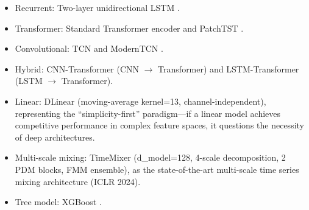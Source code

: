 \documentclass[a4paper]{cas-dc}
\begin{document}
\begin{itemize}[leftmargin=1.5em]
    \item Recurrent: Two-layer unidirectional LSTM \cite{hochreiter1997}.
    \item Transformer: Standard Transformer encoder \cite{vaswani2017} and PatchTST \cite{nie2023}.
    \item Convolutional: TCN \cite{bai2018} and ModernTCN \cite{luo2024}.
    \item Hybrid: CNN-Transformer (CNN $\rightarrow$ Transformer) and LSTM-Transformer (LSTM $\rightarrow$ Transformer).
    \item Linear: DLinear \cite{zeng2023} (moving-average kernel=13, channel-independent), representing the ``simplicity-first'' paradigm---if a linear model achieves competitive performance in complex feature spaces, it questions the necessity of deep architectures.
    \item Multi-scale mixing: TimeMixer \cite{wang2024timemixer} (d\_model=128, 4-scale decomposition, 2 PDM blocks, FMM ensemble), as the state-of-the-art multi-scale time series mixing architecture (ICLR 2024).
    \item Tree model: XGBoost \cite{chen2016}.
\end{itemize}

\begin{table}[t]
\centering
\footnotesize
\caption{Core hyperparameter configuration for each model}
\label{tab:model_config}
\end{table}
\end{document}
